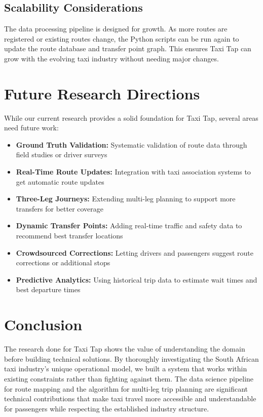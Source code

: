 \documentclass[a4paper,12pt]{article}
\begin{document}
\subsection{Scalability Considerations}
The data processing pipeline is designed for growth. As more routes are registered or existing routes change, the Python scripts can be run again to update the route database and transfer point graph. This ensures Taxi Tap can grow with the evolving taxi industry without needing major changes.

\section{Future Research Directions}
While our current research provides a solid foundation for Taxi Tap, several areas need future work:

\begin{itemize}
\item \textbf{Ground Truth Validation:} Systematic validation of route data through field studies or driver surveys
\item \textbf{Real-Time Route Updates:} Integration with taxi association systems to get automatic route updates
\item \textbf{Three-Leg Journeys:} Extending multi-leg planning to support more transfers for better coverage
\item \textbf{Dynamic Transfer Points:} Adding real-time traffic and safety data to recommend best transfer locations
\item \textbf{Crowdsourced Corrections:} Letting drivers and passengers suggest route corrections or additional stops
\item \textbf{Predictive Analytics:} Using historical trip data to estimate wait times and best departure times
\end{itemize}

\section{Conclusion}
The research done for Taxi Tap shows the value of understanding the domain before building technical solutions. By thoroughly investigating the South African taxi industry's unique operational model, we built a system that works within existing constraints rather than fighting against them. The data science pipeline for route mapping and the algorithm for multi-leg trip planning are significant technical contributions that make taxi travel more accessible and understandable for passengers while respecting the established industry structure.
\end{document}
